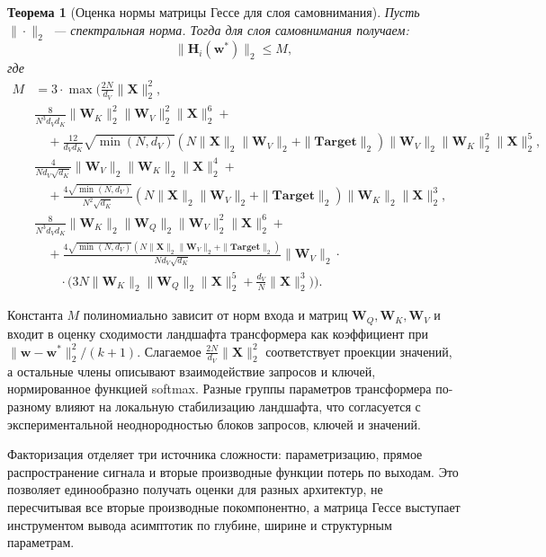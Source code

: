 \documentclass{dissert}
\newtheorem{theorem}{Теорема}
\begin{document}
\begin{theorem}[Оценка нормы матрицы Гессе для слоя самовнимания]
Пусть $\|\cdot\|_2$~--- спектральная норма. Тогда для слоя самовнимания получаем:
\[
    \|\mathbf{H}_i(\mathbf{w}^*)\|_2 \leq M,
\]
где
\begin{align}
M &= 3\cdot\max \Bigg(\frac{2N}{d_V} \| \mathbf{X}\|^2_2, \\
    &\frac{8}{N^3 d_V d_K} \| \mathbf{W}_K\|_2^2 \| \mathbf{W}_V\|^2_2 \| \mathbf{X}\|^6_2 + \\
    &\quad+\frac{12}{d_V d_K} \sqrt{\min(N, d_V)} (N \|\mathbf{X}\|_2 \|\mathbf{W}_V \|_2 + \|\textbf{Target}\|_2) \| \mathbf{W}_V \|_2 \| \mathbf{W}_K\|^2_2 \| \mathbf{X}\|^5_2, \\
    &\frac{4}{N d_V \sqrt{d_K}} \| \mathbf{W}_V\|_2 \| \mathbf{W}_K \|_2 \| \mathbf{X}\|^4_2 +\\
    &\quad+\frac{4\sqrt{\min(N, d_V)}}{N^2\sqrt{d_K}} (N \|\mathbf{X}\|_2 \|\mathbf{W}_V \|_2 + \|\textbf{Target}\|_2) \|\mathbf{W}_K\|_2 \|\mathbf{X}\|^3_2,\\
    &\frac{8}{N^3 d_V d_K} \|\mathbf{W}_K\|_2 \|\mathbf{W}_Q\|_2 \| \mathbf{W}_V\|^2_2 \|\mathbf{X} \|^6_2 + \\
    &\quad+\frac{4\sqrt{\min(N, d_V)} (N \|\mathbf{X}\|_2 \|\mathbf{W}_V \|_2 + \|\textbf{Target}\|_2)}{N d_V \sqrt{d_K}} \|\mathbf{W}_V\|_2 \cdot\\
    &\quad\quad\cdot\Big(3N \|\mathbf{W}_K\|_2 \|\mathbf{W}_Q\|_2 \| \mathbf{X}\|^5_2 + \frac{d_V}{N} \|\mathbf{X}\|^3_2\Big)\Bigg).
\end{align}
\end{theorem}

Константа $M$ полиномиально зависит от норм входа и матриц $\mathbf{W}_Q,\mathbf{W}_K,\mathbf{W}_V$ и входит в оценку сходимости ландшафта трансформера как коэффициент при $\|\mathbf{w}-\mathbf{w}^*\|_2^2/(k+1)$.
Слагаемое $\frac{2N}{d_V}\|\mathbf{X}\|_2^2$ соответствует проекции значений, а остальные члены описывают взаимодействие запросов и ключей, нормированное функцией softmax.
Разные группы параметров трансформера по-разному влияют на локальную стабилизацию ландшафта, что согласуется с экспериментальной неоднородностью блоков запросов, ключей и значений.

Факторизация отделяет три источника сложности: параметризацию, прямое распространение сигнала и вторые производные функции потерь по выходам.
Это позволяет единообразно получать оценки для разных архитектур, не пересчитывая все вторые производные покомпонентно, а матрица Гессе выступает инструментом вывода асимптотик по глубине, ширине и структурным параметрам.
\end{document}
